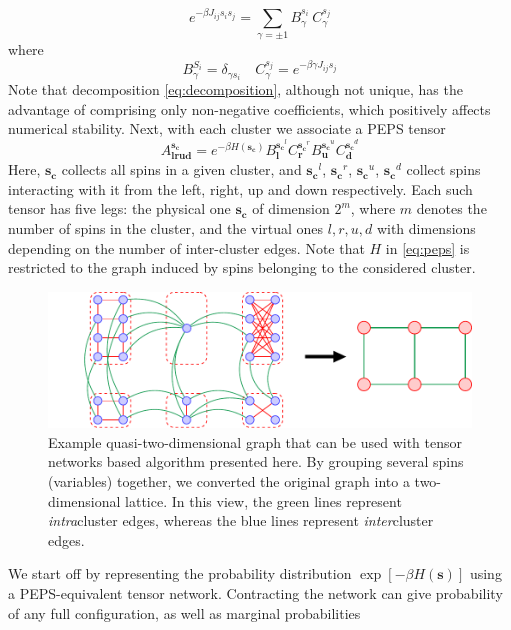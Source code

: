 \begin{equation}
    e^{-\beta J_{ij}s_i s_j} = \sum_{\gamma = \pm 1} B^{s_{i\phantom{j}}}_\gamma C^{s_j}_\gamma
\end{equation}
where 
\begin{equation}
\label{eq:decomposition}
    B^{S_i}_\gamma = \delta_{\gamma s_i} \quad C^{s_j}_\gamma = e^{-\beta \gamma J_{ij} s_j}
\end{equation}
Note that decomposition \eqref{eq:decomposition}, although not unique, has the advantage of comprising only non-negative coefficients, which positively affects numerical stability.
Next, with each cluster we associate a PEPS tensor
\begin{equation}
\label{eq:peps}
A^{\mathbf{s_c}}_{\mathbf{lrud}} = e^{-\beta H(\mathbf{s_c})} B^{\mathbf{s_c}^l}_\mathbf{l}C^{\mathbf{s_c}^r}_\mathbf{r}B^{\mathbf{s_c}^u}_\mathbf{u}C^{\mathbf{s_c}^d}_\mathbf{d}
\end{equation}
Here, $\mathbf{s_c}$ collects all spins in a given cluster, and $\mathbf{s_c}^l$, $\mathbf{s_c}^r$, $\mathbf{s_c}^u$, $\mathbf{s_c}^d$ collect spins interacting with it from the left, right, up and down respectively. Each such tensor has five legs: the physical one $\mathbf{s_c}$ of dimension $2^m$, where $m$ denotes the number of spins in the cluster, and the virtual ones $l, r, u, d$ with dimensions depending on the number of inter-cluster edges. Note that $H$ in \eqref{eq:peps} is restricted to the graph induced by spins belonging to the considered cluster.

\begin{figure}
    \centering
    \includegraphics[width=\textwidth]{figures/clustering.pdf}
    \caption{Example quasi-two-dimensional graph that can be used with tensor networks based algorithm presented here. By grouping several spins (variables) together, we converted the original graph into a two-dimensional lattice. In this view, the green lines represent \emph{intra}cluster edges, whereas the blue lines represent \emph{inter}cluster edges.}
    \label{fig:quasi2d}
\end{figure}
We start off by representing the probability distribution $\exp[-\beta H(\mathbf{s})]$ using a PEPS-equivalent tensor network.
Contracting the network can give probability of any full configuration, as well as marginal probabilities

